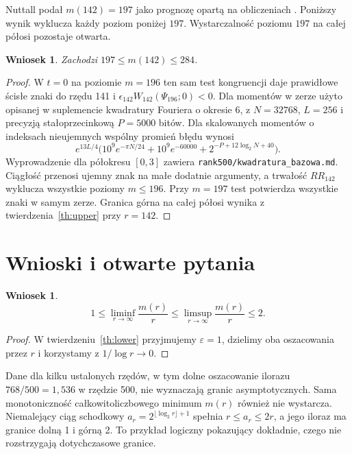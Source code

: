 \documentclass[11pt,a4paper,reqno]{amsart}
\newtheorem{corollary}[theorem]{Wniosek}
\numberwithin{equation}{section}
\begin{document}
Nuttall podał \(m(142)=197\) jako prognozę opartą na obliczeniach \cite[(1.5)]{nuttallsplit}. Poniższy wynik wyklucza każdy poziom poniżej \(197\). Wystarczalność poziomu \(197\) na całej półosi pozostaje otwarta.

\begin{corollary}\label{cor:witness142}
Zachodzi \(197\le m(142)\le284\).
\end{corollary}
\begin{proof}
W \(t=0\) na poziomie \(m=196\) ten sam test kongruencji daje prawidłowe ścisłe znaki do rzędu 141 i \(\epsilon_{142}W_{142}(\Psi_{196};0)<0\). Dla momentów w zerze użyto opisanej w suplemencie kwadratury Fouriera o okresie 6, z \(N=32768\), \(L=256\) i precyzją stałoprzecinkową \(P=5000\) bitów. Dla skalowanych momentów o indeksach nieujemnych wspólny promień błędu wynosi \[e^{13L/4}\big(10^9e^{-\pi N/24}+10^9e^{-60000}+2^{-P+12\log_2 N+40}\big).\] Wyprowadzenie dla półokresu \([0,3]\) zawiera \texttt{rank500/kwadratura\_bazowa.md}. Ciągłość przenosi ujemny znak na małe dodatnie argumenty, a trwałość \(RR_{142}\) wyklucza wszystkie poziomy \(m\le196\). Przy \(m=197\) test potwierdza wszystkie znaki w samym zerze. Granica górna na całej półosi wynika z twierdzenia~\ref{th:upper} przy \(r=142\).
\end{proof}

\section{Wnioski i otwarte pytania}\label{sec:consequences}


\begin{corollary}\label{cor:asym}
\[1\le\liminf_{r\to\infty}\frac{m(r)}r\le\limsup_{r\to\infty}\frac{m(r)}r\le2.\]
\end{corollary}


\begin{proof}
W twierdzeniu~\ref{th:lower} przyjmujemy \(\varepsilon=1\), dzielimy oba oszacowania przez \(r\) i korzystamy z \(1/\log r\to0\).
\end{proof}


Dane dla kilku ustalonych rzędów, w tym dolne oszacowanie ilorazu \(768/500=1{,}536\) w rzędzie 500, nie wyznaczają granic asymptotycznych. Sama monotoniczność całkowitoliczbowego minimum \(m(r)\) również nie wystarcza. Niemalejący ciąg schodkowy \(a_r=2^{\lfloor\log_2 r\rfloor+1}\) spełnia \(r\le a_r\le2r\), a jego iloraz ma granice dolną 1 i górną 2. To przykład logiczny pokazujący dokładnie, czego nie rozstrzygają dotychczasowe granice.
\end{document}
